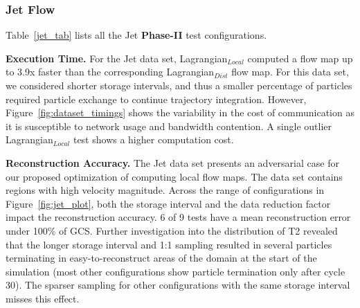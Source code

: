 


\subsubsection{Jet Flow}
\label{sec:jet}
Table~\ref{jet_tab} lists all the Jet \textbf{Phase-II} test configurations.
%


\textbf{Execution Time.} For the Jet data set, Lagrangian$_{Local}$ computed a flow map up to 3.9x faster than the corresponding Lagrangian$_{Dist}$ flow map.
%
For this data set, we considered shorter storage intervals, and thus a smaller percentage of particles required particle exchange to continue trajectory integration.
%
However, Figure~\ref{fig:dataset_timings} shows the variability in the cost of communication as it is susceptible to network usage and bandwidth contention.
%
A single outlier Lagrangian$_{Local}$ test shows a higher computation cost. 



\textbf{Reconstruction Accuracy.} The Jet data set presents an adversarial case for our proposed optimization of computing local flow maps.
%
The data set contains regions with high velocity magnitude.
%
Across the range of configurations in Figure~\ref{fig:jet_plot}, both the storage interval and the data reduction factor impact the reconstruction accuracy.
%
6 of 9 tests have a mean reconstruction error under 100\% of GCS. 
%
Further investigation into the distribution of T2 revealed that the longer storage interval and 1:1 sampling resulted in several particles terminating in easy-to-reconstruct areas of the domain at the start of the simulation (most other configurations show particle termination only after cycle 30).
%
The sparser sampling for other configurations with the same storage interval misses this effect.
%
%

